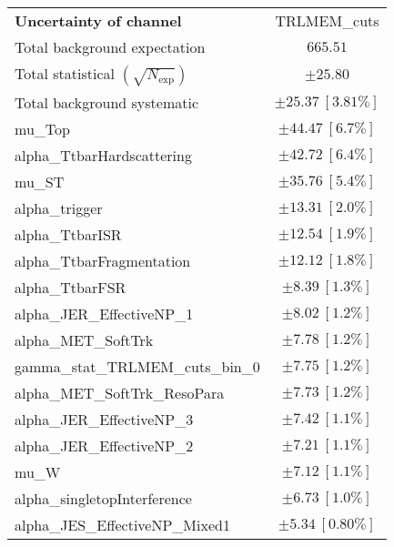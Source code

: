 
\begin{table}
\begin{center}
\setlength{\tabcolsep}{0.0pc}
\begin{tabular*}{\textwidth}{@{\extracolsep{\fill}}lc}
\noalign{\smallskip}\hline\noalign{\smallskip}
{\textbf{Uncertainty of channel}}                                    & TRLMEM\_cuts            \\
\noalign{\smallskip}\hline\noalign{\smallskip}
Total background expectation             &  $665.51$       \\
\noalign{\smallskip}\hline\noalign{\smallskip}
Total statistical $(\sqrt{N_{\mathrm{exp}}})$              & $\pm 25.80$       \\
Total background systematic               & $\pm 25.37\ [3.81\%] $             \\
\noalign{\smallskip}\hline\noalign{\smallskip}
\noalign{\smallskip}\hline\noalign{\smallskip}
mu\_Top         & $\pm 44.47\ [6.7\%] $       \\
alpha\_TtbarHardscattering         & $\pm 42.72\ [6.4\%] $       \\
mu\_ST         & $\pm 35.76\ [5.4\%] $       \\
alpha\_trigger         & $\pm 13.31\ [2.0\%] $       \\
alpha\_TtbarISR         & $\pm 12.54\ [1.9\%] $       \\
alpha\_TtbarFragmentation         & $\pm 12.12\ [1.8\%] $       \\
alpha\_TtbarFSR         & $\pm 8.39\ [1.3\%] $       \\
alpha\_JER\_EffectiveNP\_1         & $\pm 8.02\ [1.2\%] $       \\
alpha\_MET\_SoftTrk         & $\pm 7.78\ [1.2\%] $       \\
gamma\_stat\_TRLMEM\_cuts\_bin\_0         & $\pm 7.75\ [1.2\%] $       \\
alpha\_MET\_SoftTrk\_ResoPara         & $\pm 7.73\ [1.2\%] $       \\
alpha\_JER\_EffectiveNP\_3         & $\pm 7.42\ [1.1\%] $       \\
alpha\_JER\_EffectiveNP\_2         & $\pm 7.21\ [1.1\%] $       \\
mu\_W         & $\pm 7.12\ [1.1\%] $       \\
alpha\_singletopInterference         & $\pm 6.73\ [1.0\%] $       \\
alpha\_JES\_EffectiveNP\_Mixed1         & $\pm 5.34\ [0.80\%] $       \\

\end{tabular*}
\end{center}
\end{table}
